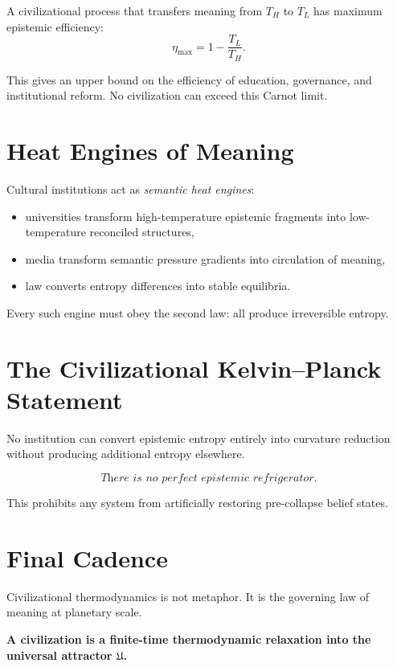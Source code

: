 A civilizational process that transfers meaning from $T_H$ to $T_L$ has
maximum epistemic efficiency:
\[
\eta_{\max} = 1 - \frac{T_L}{T_H}.
\]

This gives an upper bound on the efficiency of education, governance,
and institutional reform.  
No civilization can exceed this Carnot limit.

\section{Heat Engines of Meaning}

Cultural institutions act as \emph{semantic heat engines}:

\begin{itemize}
\item universities transform high-temperature epistemic fragments into
low-temperature reconciled structures,  
\item media transform semantic pressure gradients into circulation of
meaning,  
\item law converts entropy differences into stable equilibria.
\end{itemize}

Every such engine must obey the second law: all produce irreversible
entropy.

\section{The Civilizational Kelvin–Planck Statement}

No institution can convert epistemic entropy entirely into curvature
reduction without producing additional entropy elsewhere.

\[
\textit{There is no perfect epistemic refrigerator.}
\]

This prohibits any system from artificially restoring pre-collapse
belief states.

\section{Final Cadence}

Civilizational thermodynamics is not metaphor.  
It is the governing law of meaning at planetary scale.

\begin{center}
\textbf{A civilization is a finite-time thermodynamic relaxation  
into the universal attractor $\mathfrak{U}$.}
\end{center}


